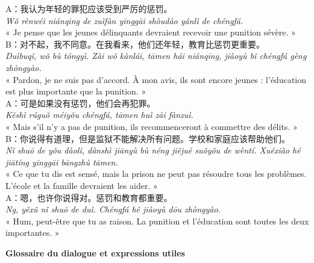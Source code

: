 \documentclass[11pt]{article}
\begin{document}
\begin{textebox}
A：我认为年轻的罪犯应该受到严厉的惩罚。\\
\emph{Wǒ rènwéi niánqīng de zuìfàn yīnggāi shòudào yánlì de chéngfá.}\\
« Je pense que les jeunes délinquants devraient recevoir une punition sévère. »\\[4pt]
B：对不起，我不同意。在我看来，他们还年轻，教育比惩罚更重要。\\
\emph{Duìbuqǐ, wǒ bù tóngyì. Zài wǒ kànlái, tāmen hái niánqīng, jiàoyù bǐ chéngfá gèng zhòngyào.}\\
« Pardon, je ne suis pas d'accord. À mon avis, ils sont encore jeunes : l'éducation est plus importante que la punition. »\\[4pt]
A：可是如果没有惩罚，他们会再犯罪。\\
\emph{Kěshì rúguǒ méiyǒu chéngfá, tāmen huì zài fànzuì.}\\
« Mais s'il n'y a pas de punition, ils recommenceront à commettre des délits. »\\[4pt]
B：你说得有道理，但是监狱不能解决所有问题。学校和家庭应该帮助他们。\\
\emph{Nǐ shuō de yǒu dàolǐ, dànshì jiānyù bù néng jiějué suǒyǒu de wèntí. Xuéxiào hé jiātíng yīnggāi bāngzhù tāmen.}\\
« Ce que tu dis est sensé, mais la prison ne peut pas résoudre tous les problèmes. L'école et la famille devraient les aider. »\\[4pt]
A：嗯，也许你说得对。惩罚和教育都重要。\\
\emph{Ng, yěxǔ nǐ shuō de duì. Chéngfá hé jiàoyù dōu zhòngyào.}\\
« Hum, peut-être que tu as raison. La punition et l'éducation sont toutes les deux importantes. »
\end{textebox}

\textbf{Glossaire du dialogue et expressions utiles}
\end{document}
